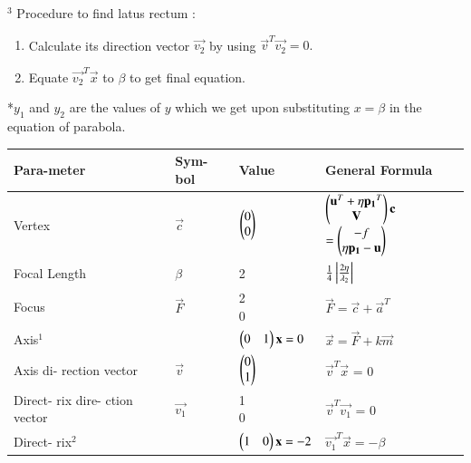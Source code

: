 \documentclass[journal,12pt,twocolumn]{IEEEtran}
\begin{document}
$^{3}$ Procedure to find latus rectum :
\begin{enumerate}
\item Calculate its direction vector $\vec{v_2}$ by using $\vec{v}^T\vec{v_2} =        0.$
    \item Equate $\vec{v_2}^T\vec{x}$ to $\beta$ to get final equation.
\end{enumerate}

*$y_1$ and $y_2$ are the values of $y$ which we get upon substituting $x=\beta$ in the equation of parabola.

\begin{table}[!ht]
\begin{center}
\begin{tabular}{ | m{1.4cm} | m{1.0cm}| m{2.4cm} | m{2.3cm} | } 
\hline
Para-\newline meter  & Sym-\newline bol  & Value  & General \newline Formula\\ 
\hline
Vertex & $\vec{c}$ & $\begin{pmatrix}0\\0\end{pmatrix}$ & $\begin{pmatrix}\mathbf{u}^T + \eta\mathbf{p_1}^T \\ \mathbf{V}\end{pmatrix}\mathbf{c}$ \newline $= \begin{pmatrix}-f \\ \eta\mathbf{p_1} - \mathbf{u}\end{pmatrix}$ \\ 
\hline
Focal \newline Length & $\beta$ & 2 & $\frac{1}{4}\left\vert\frac{2\eta}{\lambda_2}\right\vert$
\\ 
\hline
Focus & $\vec{F}$ & \myvec{2\\0} & $\vec{F}=\vec{c} + \vec{a}^T$ \\
\hline
Axis$^{1}$ &  & $\begin{pmatrix}0 & 1\end{pmatrix}\mathbf{x}=0$ & $\vec{x}=\vec{F}+k\vec{m}$ \\
\hline
Axis di- \newline rection \newline vector & $\vec{v}$ & $\begin{pmatrix}0 \\ 1\end{pmatrix}$ & $\vec{v}^T\vec{x}$ = 0 \\
\hline
Direct- \newline rix dire- \newline ction \newline vector & $\vec{v_1}$ & \myvec{1 \\ 0} & $\vec{v}^T\vec{v_1}$ = 0 \\
\hline
Direct- \newline rix$^{2}$ &  & $\begin{pmatrix}1 & 0\end{pmatrix}\mathbf{x} = -2$ & $\vec{v_1}^T\vec{x} = -\beta$ \\

\end{tabular}
\end{center}
\end{table}
\end{document}
